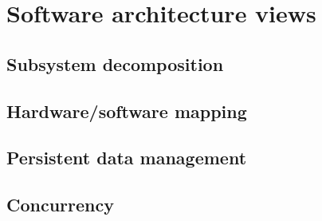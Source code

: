 \label{Software architecture views}
\section{Software architecture views}

\subsection{Subsystem decomposition}
\subsection{Hardware/software mapping}
\subsection{Persistent data management}
\subsection{Concurrency}

\newpage
